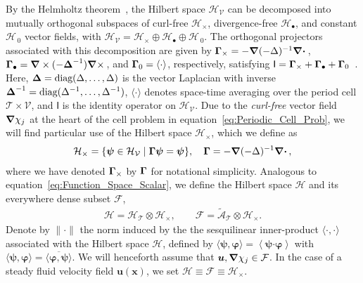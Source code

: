 \documentclass[leqno,onefignum,onetabnum]{siamltex1213}
\newcommand{\Tc}{\mathcal{T}}
\newcommand{\Vc}{\mathcal{V}}
\newcommand{\Hc}{\mathcal{H}}
\newcommand{\Fc}{\mathcal{F}}
\newcommand{\Ac}{\mathcal{A}}
\newcommand{\Ib}{\mathsf{I}}
\newcommand\bDelta{\mbox{\boldmath${\Delta}$}}
\newcommand\bGamma{\mbox{\boldmath${\Gamma}$}}
\newcommand\bnabla{\mbox{\boldmath${\nabla}$}}
\providecommand\bcdot{\boldsymbol{\cdot}}
\newcommand{\vecx}{\boldsymbol{x}}
\newcommand{\vecu}{\boldsymbol{u}}
\newcommand{\vecpsi}{\boldsymbol{\psi}}
\newcommand{\vecvarphi}{\boldsymbol{\varphi}}
\begin{document}
By the Helmholtz theorem~\cite{Denaro:2003:0271,Bhatia:IEE:1077}, the
Hilbert space $\Hc_{\Vc}$ can be decomposed into mutually orthogonal
subspaces of curl-free $\Hc_\times$, divergence-free $\Hc_\bullet$, and constant
$\Hc_{\,0}$ vector fields, with $\Hc_{\Vc}=\Hc_\times\oplus\Hc_\bullet\oplus\Hc_{\,0}$.  The orthogonal projectors associated with this decomposition are given by 
$\bGamma_\times=-\bnabla(-\Delta)^{-1}\bnabla \bcdot\,$,
$\bGamma_\bullet=\bnabla\times(-\bDelta^{-1})\bnabla \times\,$, and $\bGamma_0=\langle\cdot\rangle$, 
respectively, satisfying
$\Ib=\bGamma_\times+\bGamma_\bullet+\bGamma_0$~\cite{Fannjiang:1994:SIAM_JAM:333,MILTON:2002:TC}. Here, 
$\bDelta=\text{diag}(\Delta,\ldots,\Delta)$ is the vector Laplacian with inverse
$\bDelta^{-1}=\text{diag}(\Delta^{-1},\ldots,\Delta^{-1})$, $\langle\cdot\rangle$ denotes space-time
averaging over the period cell $\Tc\times\Vc$, and $\Ib$ is the identity
operator on $\Hc_{\Vc}$. Due to the \emph{curl-free} vector field
$\bnabla\chi_j$ at the heart of the cell problem in
equation~\eqref{eq:Periodic_Cell_Prob}, we will find particular use of
the Hilbert space $\Hc_\times$, which we define as 
%
\begin{align}\label{eq:Hilbert_Curl_Free}
  \Hc_\times=\{\vecpsi\in\Hc_{\Vc} \; | \; \bGamma\vecpsi=\vecpsi\},
  \quad
  \bGamma=-\bnabla(-\Delta)^{-1}\bnabla \bcdot\,,
\end{align}
%
where we have denoted $\bGamma_\times$ by $\bGamma$ for notational
simplicity. Analogous to equation~\eqref{eq:Function_Space_Scalar}, we
define the Hilbert space $\Hc$ and its everywhere dense subset $\Fc$,  
%
\begin{align}\label{eq:Function_Space_Vector} 
  \Hc=\Hc_{\Tc}\otimes\Hc_\times,  \qquad
  \Fc=\tilde{\Ac}_{\Tc}\otimes\Hc_\times.
\end{align}
%
Denote by $\|\cdot\|$ the norm induced by the the sesquilinear inner-product
$\langle\cdot,\cdot\rangle$ associated with the Hilbert space $\Hc$, 
defined by $\langle\vecpsi,\vecvarphi\rangle=\left\langle\vecpsi\bcdot\vecvarphi\right\rangle$
with $\langle\vecpsi,\vecvarphi\rangle=\overline{\langle\vecvarphi,\vecpsi\rangle}$. We will
henceforth assume that $\vecu,\bnabla\chi_j\in\Fc$. In the case of a steady fluid
velocity field $\vecu(\vecx)$, we set $\Hc\equiv\Fc\equiv\Hc_\times$.
\end{document}
